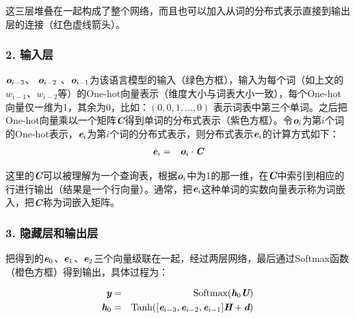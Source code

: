 \parinterval  这三层堆叠在一起构成了整个网络，而且也可以加入从词的分布式表示直接到输出层的连接（红色虚线箭头）。


\subsubsection{2. 输入层}

\parinterval  $ {\textbf{\em o}}_{i-3} $、 $ {\textbf{\em o}}_{i-2} $ 、$ {\textbf{\em o}}_{i-1} $为该语言模型的输入（绿色方框），输入为每个词（如上文的$ w_{i-1}$、$ w_{i-2}$等）的One-hot向量表示（维度大小与词表大小一致），每个One-hot向量仅一维为1，其余为0，比如：$ (0,0,1,\dots,0) $ 表示词表中第三个单词。之后把One-hot向量乘以一个矩阵$ \textbf{\em C} $得到单词的分布式表示（紫色方框）。令$ {\textbf{\em o}}_i $为第$ i $个词的One-hot表示，$ {\textbf{\em e}}_i $为第$ i $个词的分布式表示，则分布式表示$ {\textbf{\em e}}_i $的计算方式如下：
\begin{eqnarray}
{\textbf{\em e}}_i&=&{\textbf{\em o}}_i\cdot{\textbf{\em C}}
\label{eq:9-60}
\end{eqnarray}

\noindent  这里的$ \textbf{\em C} $可以被理解为一个查询表，根据$ {\textbf{\em o}}_i $中为1的那一维，在$ \textbf{\em C}$中索引到相应的行进行输出（结果是一个行向量）。通常，把${\textbf{\em e}}_i$这种单词的实数向量表示称为词嵌入，把$ \textbf{\em C} $称为词嵌入矩阵。


\subsubsection{3. 隐藏层和输出层}

\parinterval  把得到的$ {\textbf{\em e}}_0 $、$ {\textbf{\em e}}_1 $、$ {\textbf{\em e}}_2 $三个向量级联在一起，经过两层网络，最后通过Softmax函数（橙色方框）得到输出，具体过程为：

\begin{eqnarray}
{\textbf{\em y}}&=&{\textrm{Softmax}}({\textbf{\em h}}_0{\textbf{\em U}})\label{eq:9-61}\\
{\textbf{\em h}}_0&=&{\textrm{Tanh}}([{\textbf{\em e}}_{i-3},{\textbf{\em e}}_{i-2},{\textbf{\em e}}_{i-1}]{\textbf{\em H}}+{\textbf{\em d}})
\label{eq:9-62}
\end{eqnarray}

